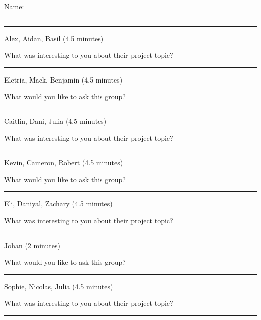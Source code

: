 \documentclass[12pt,letterpaper,noanswers]{exam}
\begin{document}
 \pdfpageheight 11in 
  \pdfpagewidth 8.5in
  
  \noindent Name: \rule{2.5in}{0.5pt}
  \vspace{0.2cm}
  
 
   \hrule
  \vspace{0.1cm}
  
 \noindent Alex, Aidan, Basil (4.5 minutes)
  
 \noindent What was interesting to you about their project topic?
\vfill
 
 \hrule
  \vspace{0.1cm}
  
   \noindent Eletria, Mack, Benjamin
   (4.5 minutes)
 
  \noindent What would you like to ask this group?


\vfill

\hrule
 \vspace{0.1cm}

 
\noindent Caitlin, Dani, Julia (4.5 minutes)
  
 \noindent What was interesting to you about their project topic?
\vfill
 
   \hrule
  \vspace{0.1cm}

\noindent Kevin, Cameron, Robert (4.5 minutes)

  \noindent What would you like to ask this group?


\vfill
 \hrule
  \vspace{0.1cm}
 
 \noindent Eli, Daniyal, Zachary (4.5 minutes)
 
 \noindent What was interesting to you about their project topic?
\vfill

 \hrule
 \vspace{0.1cm}

  
 \noindent Johan (2 minutes)
 
  \noindent What would you like to ask this group?


\vfill
 


   \hrule
  \vspace{0.1cm}

 \eject 
 

\noindent Sophie, Nicolas, Julia (4.5 minutes)

 \noindent What was interesting to you about their project topic?
\vfill

 \hrule
  \vspace{0.1cm}
 
\end{document}
